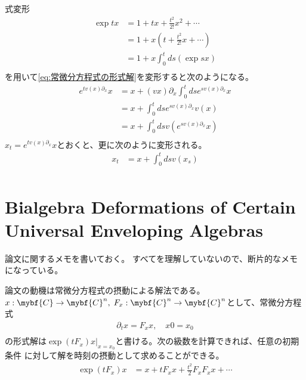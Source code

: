 	\begin{note}[Picardの再帰法]\label{note:Picardの再帰法} %
		式変形
		\begin{equation}\begin{split} %
			\exp tx &= 1 + tx + \frac{t^2}{2!}x^2 + \cdots \\
				&= 1 + x(t + \frac{t^2}{2!}x + \cdots) \\
				&= 1 + x\int_0^t ds (\exp sx) \\
		\end{split}\end{equation} %
		を用いて\eqref{eq:常微分方程式の形式解}を変形すると次のようになる。
		\begin{equation}\begin{split} %
			e^{tv(x)\partial_x}x
			&= x + (vx)\partial_x\int_{0}^t dse^{sv(x)\partial_x}x \\
			&= x + \int_{0}^t dse^{sv(x)\partial_x}v(x) \\
			&= x + \int_{0}^t dsv(e^{sv(x)\partial_x}x) \\
		\end{split}\end{equation} %
		$x_t=e^{tv(x)\partial_x}x$とおくと、更に次のように変形される。
		\begin{equation}\begin{split} %
			x_t &= x + \int_0^t dsv(x_s) \\
		\end{split}\end{equation} %
	\end{note} %

\section{Bialgebra Deformations of Certain Universal Enveloping Algebras}\label{s1:Bialgebra Deformations of Certain Universal Enveloping Algebras} %
	論文\cite{url:grossman:deform}に関するメモを書いておく。
	すべてを理解していないので、断片的なメモになっている。

	論文\cite{url:grossman:deform}の動機は常微分方程式の摂動による解法である。
	$x:\mybf{C}\to \mybf{C}^n,\;F_x:\mybf{C}^n\to \mybf{C}^n$として、常微分方程式
	\begin{equation}\begin{split} %
		\partial_tx = F_xx,\quad x0 = x_0 \\
	\end{split}\end{equation} %
	の形式解は$\exp(tF_x)x|_{x=x_0}$と書ける。次の級数を計算できれば、任意の初期条件
	に対して解を時刻の摂動として求めることができる。
	\begin{equation}\begin{split} %
		\exp(tF_x)x &= x + tF_xx + \frac{t^2}{2}F_xF_xx + \cdots \\
	\end{split}\end{equation} %

